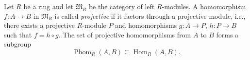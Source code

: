 Let $R$ be a ring and let $\mathfrak{M}_R$ be the category of left $R$-modules. A homomorphism $f : A \to B$ in $\mathfrak{M}_R$ is called {\it projective} if it factors through a projective module, i.e., there exists a projective $R$-module $P$ and homomorphisms $g : A \to P$, $h : P \to B$ such that $f = h \circ g$. The set of projective homomorphisms from $A$ to $B$ forms a subgroup
\[
\operatorname{Phom}_R(A, B) \subseteq \operatorname{Hom}_R(A, B).
\]
